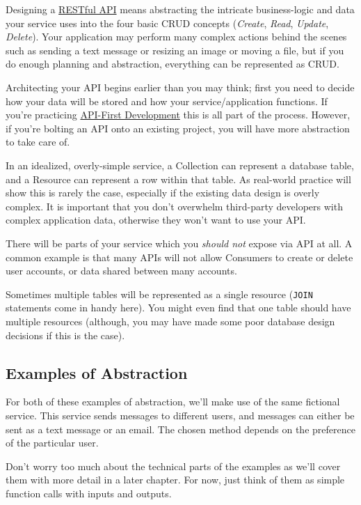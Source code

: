 \documentclass{book}
\begin{document}
Designing a \href{http://en.wikipedia.org/wiki/Restful}{RESTful API} means abstracting the intricate business-logic and data your service uses into the four basic CRUD concepts (\emph{Create}, \emph{Read}, \emph{Update}, \emph{Delete}). Your application may perform many complex actions behind the scenes such as sending a text message or resizing an image or moving a file, but if you do enough planning and abstraction, everything can be represented as CRUD.

Architecting your API begins earlier than you may think; first you need to decide how your data will be stored and how your service/application functions. If you're practicing \href{http://blog.pop.co/post/67465239611/why-we-chose-api-first-development}{API-First Development} \cite{APIFIRST} this is all part of the process. However, if you're bolting an API onto an existing project, you will have more abstraction to take care of.

In an idealized, overly-simple service, a Collection can represent a database table, and a Resource can represent a row within that table. As real-world practice will show this is rarely the case, especially if the existing data design is overly complex. It is important that you don't overwhelm third-party developers with complex application data, otherwise they won't want to use your API.

There will be parts of your service which you \emph{should not} expose via API at all. A common example is that many APIs will not allow Consumers to create or delete user accounts, or data shared between many accounts.

Sometimes multiple tables will be represented as a single resource (\texttt{JOIN} statements come in handy here). You might even find that one table should have multiple resources (although, you may have made some poor database design decisions if this is the case).

\subsection{Examples of Abstraction}

For both of these examples of abstraction, we'll make use of the same fictional service. This service sends messages to different users, and messages can either be sent as a text message or an email. The chosen method depends on the preference of the particular user.

Don't worry too much about the technical parts of the examples as we'll cover them with more detail in a later chapter. For now, just think of them as simple function calls with inputs and outputs.
\end{document}
